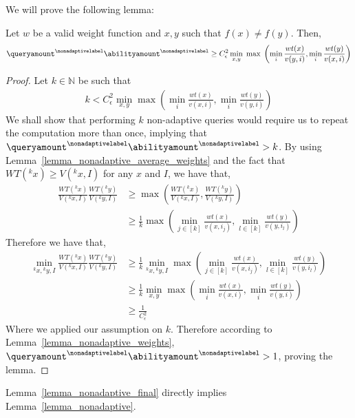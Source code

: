 We will prove the following lemma:
\begin{lemma}\label{lemma_nonadaptive_final}
    Let $w$ be a valid weight function and $x,y$ such that $f(x)\neq f(y)$. Then,
    \begin{align*}
    \queryamount^{\nonadaptivelabel} \abilityamount^{\nonadaptivelabel} \geq C^2_{\epsilon} \min_{x,y}\; \max\; \left(\min_i \frac{wt(x)}{v(y,i)}, \min_i \frac{wt(y)}{v(x,i)}\right)
    \end{align*}
\end{lemma}
\begin{proof}
    Let $k\in \mathbb{N}$ be such that
    \begin{align}
        k < C^2_{\epsilon} \min_{x,y} \max \left(\min_i \frac{wt(x)}{v(x,i)}, \min_i \frac{wt(y)}{v(y,i)}\right)
    \end{align}
    We shall show that performing $k$ non-adaptive queries would require us to repeat the computation more than once, implying that $\queryamount^{\nonadaptivelabel}\abilityamount^{\nonadaptivelabel}>k$. By using Lemma~\ref{lemma_nonadaptive_average_weights} and the fact that $WT({}^kx)\geq V({}^kx,I)$ for any $x$ and $I$, we have that,
    \begin{align*}
        \frac{WT({}^kx)}{V({}^kx, I)}\frac{WT({}^ky)}{V({}^ky, I)} &\geq \max \left(\frac{WT({}^kx)}{V({}^kx, I)},\frac{WT({}^ky)}{V({}^ky, I)}\right)\\
        &\geq \frac{1}{k} \max \left(\min_{j\in [k]}\frac{wt(x)}{v(x,i_j)}, \min_{l\in [k]}\frac{wt(y)}{v(y,i_l)}\right)
    \end{align*}
    Therefore we have that,
    \begin{align*}
        \min_{{}^kx, {}^ky, I} \frac{WT({}^kx)}{V({}^kx, I)}\frac{WT({}^ky)}{V({}^ky, I)} &\geq \frac{1}{k} \min_{{}^kx, {}^ky, I} \max \left(\min_{j\in [k]}\frac{wt(x)}{v(x,i_j)}, \min_{l\in [k]}\frac{wt(y)}{v(y,i_l)}\right)\\
        &\geq \frac{1}{k} \min_{x, y} \max \left(\min_i \frac{wt(x)}{v(x,i)}, \min_i \frac{wt(y)}{v(y,i)}\right)\\
        & \geq \frac{1}{C^2_{\epsilon}}
    \end{align*}
    Where we applied our assumption on $k$. Therefore according to Lemma~\ref{lemma_nonadaptive_weights}, $\queryamount^{\nonadaptivelabel}\abilityamount^{\nonadaptivelabel} > 1$, proving the lemma.
\end{proof}

Lemma~\ref{lemma_nonadaptive_final} directly implies Lemma~\ref{lemma_nonadaptive}.

